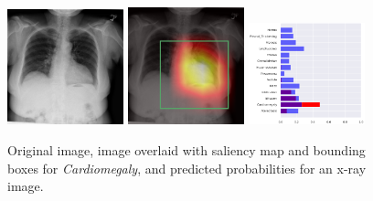 \documentclass[8pt]{beamer}
\begin{document}
\begin{frame}
\begin{figure}[H]
  \centering
  \includegraphics[width=0.3\textwidth]{images/preds/cardiomegaly}\hspace{0.01\textwidth}%
  \includegraphics[width=0.3\textwidth]{images/preds/cardiomegaly_cam}\hspace{0.01\textwidth}%
  \includegraphics[width=0.3\textwidth]{images/preds/cardiomegaly_probs}\\[0.01\textwidth]
  \caption{Original image, image overlaid with saliency map and bounding boxes
    for \emph{Cardiomegaly}, and predicted probabilities for an x-ray image.}
  \label{examples_2}
\end{figure}
\end{frame}
\end{document}
